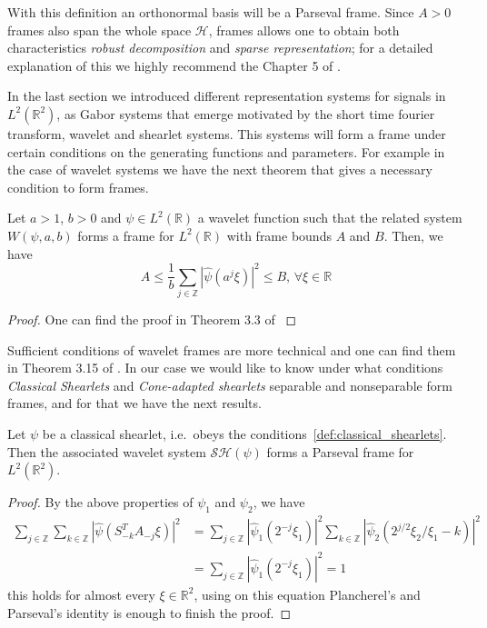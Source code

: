 \bigskip

With this definition an orthonormal basis will be a Parseval frame. Since $A>0$ frames also span the whole space $\mathcal{H}$, frames allows one to obtain both characteristics \textit{robust decomposition} and \textit{sparse representation}; for a detailed explanation of this we highly recommend the Chapter 5 of \cite{Mallat}.

\bigskip

In the last section we introduced different representation systems for signals in $L^2(\mathbb{R}^2)$, as Gabor systems that emerge motivated by the short time fourier transform, wavelet and shearlet systems. This systems will form a frame under certain conditions on the generating functions and parameters. For example in the case of wavelet systems we have the next theorem that gives a necessary condition to form frames.

\bigskip

\begin{thm}
Let $a>1$, $b>0$ and $\psi\in L^2(\mathbb{R})$ a wavelet function such that the related system $W(\psi,a,b)$ forms a frame for $L^2(\mathbb{R})$ with frame bounds $A$ and $B$. Then, we have
$$
A\leq \frac{1}{b}\sum_{j\in\mathbb{Z}}|\hat{\psi}(a^j\xi)|^2\leq B \text{,   }\forall\xi\in\mathbb{R}
$$
\end{thm}
\begin{proof}
One can find the proof in Theorem 3.3 of \cite{daubechies}
\end{proof}

\bigskip

Sufficient conditions of wavelet frames are more technical and one can find them in Theorem 3.15 of \cite{Gitta-notes}. In our case we would like to know under what conditions \textit{Classical Shearlets} and \textit{Cone-adapted shearlets} separable and nonseparable form frames, and for that we have the next results.

\begin{thm}
Let $\psi$ be a classical shearlet, i.e.\ obeys the conditions~\ref{def:classical_shearlets}. Then the associated wavelet system $\mathcal{SH}(\psi)$ forms a Parseval frame for $L^2(\mathbb{R}^2)$.
\end{thm}
\begin{proof}
By the above properties of $\psi_1$ and $\psi_2$, we have
$$
\begin{aligned}
\sum_{j\in\mathbb{Z}}\sum_{k\in\mathbb{Z}}|\hat{\psi}(S^T_{-k}A_{-j}\xi)|^2&=\sum_{j\in\mathbb{Z}}|\hat{\psi}_1(2^{-j}\xi_1)|^2\sum_{k\in\mathbb{Z}}|\hat{\psi}_2(2^{j/2}\xi_2/\xi_1-k)|^2\\
&=\sum_{j\in\mathbb{Z}}|\hat{\psi}_1(2^{-j}\xi_1)|^2=1
\end{aligned}
$$
this holds for almost every $\xi\in\mathbb{R}^2$, using on this equation Plancherel's and Parseval's identity is enough to finish the proof.
\end{proof}

